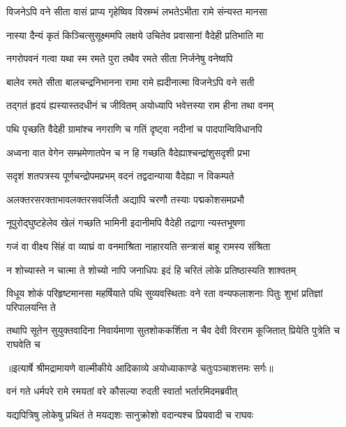 \twolineshloka
{विजनेऽपि वने सीता वासं प्राप्य गृहेष्विव}
{विस्रम्भं लभतेऽभीता रामे संन्यस्त मानसा} %

\twolineshloka
{नास्या दैन्यं कृतं किञ्चित्सुसूक्ष्ममपि लक्षये}
{उचितेव प्रवासानां वैदेही प्रतिभाति मा} %

\twolineshloka
{नगरोपवनं गत्वा यथा स्म रमते पुरा}
{तथैव रमते सीता निर्जनेषु वनेष्वपि} %

\twolineshloka
{बालेव रमते सीता बालचन्द्रनिभानना}
{रामा रामे ह्यदीनात्मा विजनेऽपि वने सती} %

\twolineshloka
{तद्गतं हृदयं ह्यस्यास्तदधीनं च जीवितम्}
{अयोध्यापि भवेत्तस्या राम हीना तथा वनम्} %

\twolineshloka
{पथि पृच्छति वैदेही ग्रामांश्च नगराणि च}
{गतिं दृष्ट्वा नदीनां च पादपान्विविधानपि} %

\twolineshloka
{अध्वना वात वेगेन सम्भ्रमेणातपेन च}
{न हि गच्छति वैदेह्याश्चन्द्रांशुसदृशी प्रभा} %

\twolineshloka
{सदृशं शतपत्रस्य पूर्णचन्द्रोपमप्रभम्}
{वदनं तद्वदान्याया वैदेह्या न विकम्पते} %

\twolineshloka
{अलक्तरसरक्ताभावलक्तरसवर्जितौ}
{अद्यापि चरणौ तस्याः पद्मकोशसमप्रभौ} %

\twolineshloka
{नूपुरोद्घुष्टहेलेव खेलं गच्छति भामिनी}
{इदानीमपि वैदेही तद्रागा न्यस्तभूषणा} %

\twolineshloka
{गजं वा वीक्ष्य सिंहं वा व्याघ्रं वा वनमाश्रिता}
{नाहारयति सन्त्रासं बाहू रामस्य संश्रिता} %

\twolineshloka
{न शोच्यास्ते न चात्मा ते शोच्यो नापि जनाधिपः}
{इदं हि चरितं लोके प्रतिष्ठास्यति शाश्वतम्} %

\fourlineindentedshloka
{विधूय शोकं परिहृष्टमानसा}
{महर्षियाते पथि सुव्यवस्थिताः}
{वने रता वन्यफलाशनाः पितुः}
{शुभां प्रतिज्ञां परिपालयन्ति ते} %

\fourlineindentedshloka
{तथापि सूतेन सुयुक्तवादिना}
{निवार्यमाणा सुतशोककर्शिता}
{न चैव देवी विरराम कूजितात्}
{प्रियेति पुत्रेति च राघवेति च} %


{॥इत्यार्षे श्रीमद्रामायणे वाल्मीकीये आदिकाव्ये अयोध्याकाण्डे चतुःपञ्चाशत्तमः सर्गः॥}


\twolineshloka
{वनं गते धर्मपरे रामे रमयतां वरे}
{कौसल्या रुदती स्वार्ता भर्तारमिदमब्रवीत्} %

\twolineshloka
{यद्यपित्रिषु लोकेषु प्रथितं ते मयद्यशः}
{सानुक्रोशो वदान्यश्च प्रियवादी च राघवः} %

